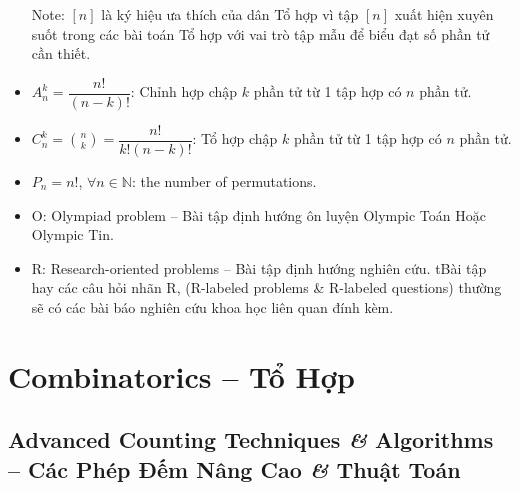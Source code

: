 \documentclass[oneside]{book}
\begin{document}
\begin{itemize}
	Note: $[n]$ là ký hiệu ưa thích của dân Tổ hợp vì tập $[n]$ xuất hiện xuyên suốt trong các bài toán Tổ hợp với vai trò tập mẫu để biểu đạt số phần tử cần thiết.
	\item $A_n^k = \dfrac{n!}{(n - k)!}$: Chỉnh hợp chập $k$ phần tử từ 1 tập hợp có $n$ phần tử.
	\item $C_n^k = \binom{n}{k} = \dfrac{n!}{k!(n - k)!}$: Tổ hợp chập $k$ phần tử từ 1 tập hợp có $n$ phần tử.
	\item $P_n = n!$, $\forall n\in\mathbb{N}$: the number of permutations.
	\item O: Olympiad problem -- Bài tập định hướng ôn luyện Olympic Toán Hoặc Olympic Tin.
	\item R: Research-oriented problems -- Bài tập định hướng nghiên cứu. tBài tập hay các câu hỏi nhãn R, (R-labeled problems \& R-labeled questions) thường sẽ có các bài báo nghiên cứu khoa học liên quan đính kèm.
\end{itemize}


\part{Combinatorics -- Tổ Hợp}


\chapter{Advanced Counting Techniques {\it\&} Algorithms -- Các Phép Đếm Nâng Cao {\it\&} Thuật Toán}
\minitoc

\end{document}
